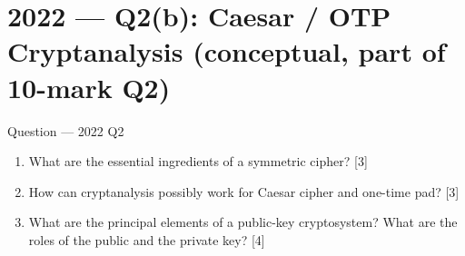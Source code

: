 \documentclass[12pt,a4paper]{article}
\begin{document}
\newpage
\section{2022 --- Q2(b): Caesar / OTP Cryptanalysis (conceptual, part of 10-mark Q2)}

\begin{qbox}{Question --- 2022 Q2}
\begin{enumerate}[label=(\alph*)]
  \item What are the essential ingredients of a symmetric cipher? \hfill [3]
  \item How can cryptanalysis possibly work for Caesar cipher and one-time pad? \hfill [3]
  \item What are the principal elements of a public-key cryptosystem? What are the roles of the public and the private key? \hfill [4]
\end{enumerate}
\end{qbox}
\end{document}

